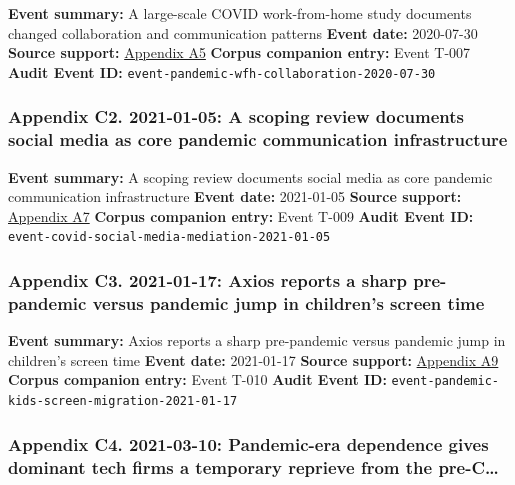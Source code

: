 \documentclass[
  american,
  11pt,
  letterpaper,
]{article}
\begin{document}
\textbf{Event summary:} A large-scale COVID work-from-home study
documents changed collaboration and communication patterns \textbf{Event
date:} 2020-07-30 \textbf{Source support:}
\hyperref[appendix-a5-how-work-from-home-affects-collaboration-a-large-scale-study-of-information-workers-in-a-natural-experiment-during-covid-19]{Appendix
A5} \textbf{Corpus companion entry:} Event T-007 \textbf{Audit Event
ID:} \texttt{event-pandemic-wfh-collaboration-2020-07-30}

\subsubsection{Appendix C2. 2021-01-05: A scoping review documents
social media as core pandemic communication
infrastructure}\label{appendix-c2-2021-01-05-a-scoping-review-documents-social-media-as-core-pandemic-communication-infrastructure}

\textbf{Event summary:} A scoping review documents social media as core
pandemic communication infrastructure \textbf{Event date:} 2021-01-05
\textbf{Source support:}
\hyperref[appendix-a7-what-social-media-told-about-us-in-the-time-of-covid-19-a-scoping-review]{Appendix
A7} \textbf{Corpus companion entry:} Event T-009 \textbf{Audit Event
ID:} \texttt{event-covid-social-media-mediation-2021-01-05}

\subsubsection{Appendix C3. 2021-01-17: Axios reports a sharp
pre-pandemic versus pandemic jump in children's screen
time}\label{appendix-c3-2021-01-17-axios-reports-a-sharp-pre-pandemic-versus-pandemic-jump-in-children-s-screen-time}

\textbf{Event summary:} Axios reports a sharp pre-pandemic versus
pandemic jump in children's screen time \textbf{Event date:} 2021-01-17
\textbf{Source support:}
\hyperref[appendix-a9-kids-screen-time-up-50-during-pandemic]{Appendix
A9} \textbf{Corpus companion entry:} Event T-010 \textbf{Audit Event
ID:} \texttt{event-pandemic-kids-screen-migration-2021-01-17}

\subsubsection{Appendix C4. 2021-03-10: Pandemic-era dependence gives
dominant tech firms a temporary reprieve from the
pre-C\ldots{}}\label{appendix-c4-2021-03-10-pandemic-era-dependence-gives-dominant-tech-firms-a-temporary-reprieve-from-the-pre-covid-techlash}
\end{document}

